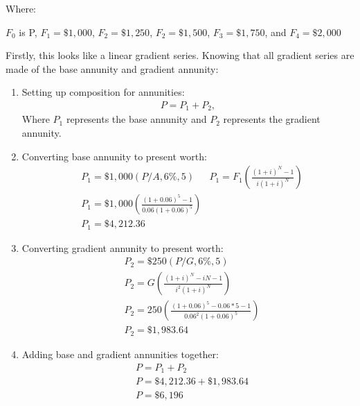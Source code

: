 \documentclass[../INDE250HW.tex]{subfiles}
\begin{document}
{
}
\newline
Where:
\begin{center}
    $F_0$ is P, $F_1 = \$1,000$, $F_2 = \$1,250$, $F_2 = \$1,500$, $F_3 = \$1,750$, and $F_4 = \$2,000$
\end{center}
Firstly, this looks like a linear gradient series. Knowing that all gradient series are made of the base annunity and gradient annunity:
\begin{enumerate}
    \item Setting up composition for annunities:
    \begin{equation*}
        \begin{aligned}
            P = P_1 + P_2,
        \end{aligned}
    \end{equation*}
    Where $P_1$ represents the base annunity and $P_2$ represents the gradient annunity.
    \item Converting base annunity to present worth:
    \begin{equation*}
        \begin{aligned}
            &P_1 = \$1,000(P/A,6\%,5)
            &P_1 = F_1\left(\frac{(1+i)^N-1}{i(1+i)^N}\right) \\
            &P_1 = \$1,000\left(\frac{(1+0.06)^{5}-1}{0.06(1+0.06)^{5}}\right) \\
            &P_1 = \$4,212.36
        \end{aligned}
    \end{equation*}
    \item Converting gradient annunity to present worth:
    \begin{equation*}
        \begin{aligned}
            &P_2 = \$250(P/G,6\%,5) \\
            &P_2 = G\left(\frac{(1+i)^N - iN -1}{i^2(1+i)^N}\right) \\
            &P_2 = 250\left(\frac{(1+0.06)^5 - 0.06*5 -1}{0.06^2(1+0.06)^5}\right) \\
            &P_2 = \$1,983.64
        \end{aligned}
    \end{equation*}
    \item Adding base and gradient annunities together:
    \begin{equation*}
        \begin{aligned}
            &P = P_1 + P_2 \\
            &P = \$4,212.36 + \$1,983.64 \\
            &P = \$6,196 
        \end{aligned}
    \end{equation*}
\end{enumerate}
\end{document}
